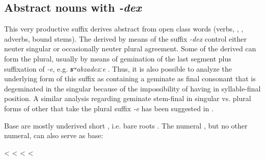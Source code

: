 
\subsection{Abstract nouns with \textit{-dex}}
\label{ssec:Abstract \isi{nouns} with -dex}

This very productive suffix derives abstract  from open class words (verbs, , , adverbs, bound stems). The  derived by means of the suffix \textit{-dex} control either neuter singular  or occasionally neuter plural agreement. Some of the derived  can form the plural, usually by means of gemination of the last segment plus suffixation of \textit{-e}, e.g. \textit{ʁʷabzadexːe} . Thus, it is also possible to analyze the underlying form of this suffix as containing a geminate as final consonant that is degeminated in the singular because of the impossibility of having  in syllable-final position. A similar analysis regarding geminate stem-final  in singular vs. plural forms of other  that take the plural suffix \textit{-e} has been suggested in . 

Base  are mostly underived short , i.e. bare roots . The numeral  , but no other numeral, can also serve as base: 
%
\begin{exe}
	\ex	\label{kːuš-dexhunger}
	\begin{xlist}
		\TabPositions{14em,16em}
		\ex	{} 	\tab	<	\tab	{} 
		\ex	{} 	\tab	<	\tab	{} 
		\ex	{} 	\tab	<	\tab	{} 
		\ex	{} 		\tab	<	\tab	{} 
	\end{xlist}
\end{exe}

